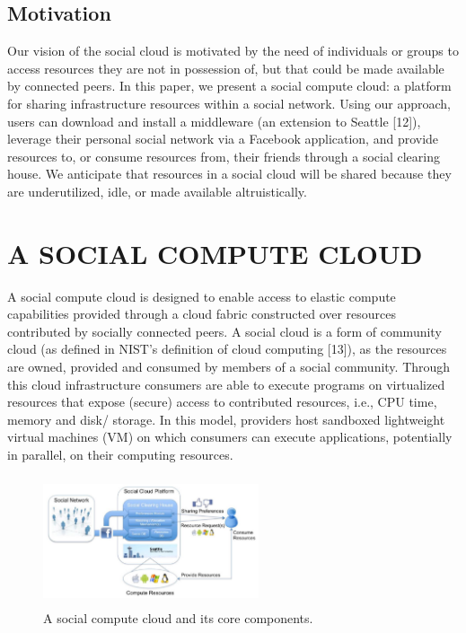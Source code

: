 \documentclass[a4paper,12pt]{article}
\begin{document}
	\subsection{Motivation}
Our vision of the social cloud is motivated by the need of individuals or groups to access resources they are not in possession of, but that could be made available by connected peers. In this paper, we present a social compute cloud: a platform for sharing infrastructure resources within a social network. Using our approach, users can download and install a middleware (an extension to Seattle [12]), leverage their personal social network via a Facebook application, and provide resources to, or consume resources from, their friends through a social clearing house. We anticipate that resources in a social cloud will be shared because they are underutilized, idle, or made available altruistically.


    \newpage
    \section{A SOCIAL COMPUTE CLOUD}
        A social compute cloud is designed to enable access to elastic compute capabilities provided through a cloud fabric constructed over resources contributed by socially connected peers. A social cloud is a form of community cloud (as defined in NIST’s definition of cloud computing [13]), as the resources are owned, provided and consumed by members of a social community. Through this cloud infrastructure consumers are able to execute programs on virtualized resources that expose (secure) access to contributed resources, i.e., CPU time, memory and disk/ storage. In this model, providers host sandboxed lightweight virtual machines (VM) on which consumers can execute applications, potentially in parallel, on their computing resources.


            \begin{figure}[htp]
                \begin{center}
                    \includegraphics[height=1.5in,width=2.5in]{jpg/compute_resource.JPG}
                \end{center}
                \caption{ A social compute cloud and its core components.} \label{Fig:1}
            \end{figure}
\end{document}
